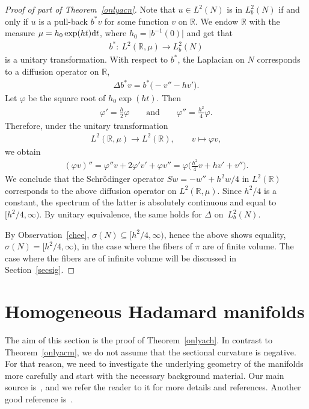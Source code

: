 \documentclass[pdftex]{sigma}
\numberwithin{equation}{section}
\def\R{\mathbb R}
\def\vf{\varphi}
\begin{document}
\begin{proof}[Proof of part of Theorem~\ref{onlyacn}]
Note that $u\in L^2(N)$ is in $L^2_b(N)$ if and only if $u$ is a pull-back $b^*v$ for some function $v$ on $\R$.
We endow $\R$ with the measure $\mu=h_0\exp(ht){\rm d}t$,
where $h_0=\big|b^{-1}(0)\big|$ and get that
\begin{align*}%
	b^* \colon \ L^2(\R,\mu) \to L^2_b(N)
\end{align*}
is a unitary transformation.
With respect to $b^*$, the Laplacian on $N$ corresponds to a diffusion operator on $\R$,
\begin{align*}%
	\Delta b^*v = b^*\bigl(- v'' - hv'\bigr).
\end{align*}
Let $\vf$ be the square root of $h_0\exp(ht)$.
Then
\begin{align*}%
	\vf' = \frac{h}2\vf \qquad\text{and}\qquad \vf'' = \frac{h^2}4\vf.
\end{align*}
Therefore, under the unitary transformation
\begin{align*}
	L^2(\R,\mu) \to L^2(\R), \qquad v \mapsto \vf v,
\end{align*}
we obtain
\begin{align*}
	(\vf v)'' = \vf''v +2\vf'v' + \vf v'' = \vf\biggl(\frac{h^2}4 v + hv' + v''\biggr).
\end{align*}
We conclude that the Schr\"odinger operator $Sw=-w''+h^2w/4$ in $L^2(\R)$
corresponds to the above diffusion operator on $L^2(\R,\mu)$.
Since $h^2/4$ is a constant, the spectrum of the latter is absolutely continuous and equal to $\bigl[h^2/4,\infty\bigr)$.
By unitary equivalence, the same holds for $\Delta$ on~$L^2_b(N)$.

By Observation~\ref{chee}, $\sigma(N)\subseteq\bigl[h^2/4,\infty\bigr)$, hence the above shows equality,
$\sigma(N)=\bigl[h^2/4,\infty\bigr)$, in the case where the fibers of $\pi$ are of finite volume.
The case where the fibers are of infinite volume will be discussed in Section~\ref{secsig}.
\end{proof}

\section{Homogeneous Hadamard manifolds}
\label{sechom}

The aim of this section is the proof of Theorem~\ref{onlyach}.
In contrast to Theorem~\ref{onlyacm}, we do not assume that the sectional curvature is negative.
For that reason, we need to investigate the underlying geometry of the manifolds more carefully
and start with the necessary background material.
Our main source is~\cite{Wolter91},
and we refer the reader to it for more details and references.
Another good reference is~\cite{Heber93}.
\end{document}
